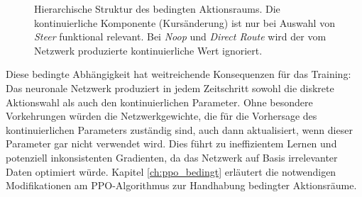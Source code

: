 \begin{figure}[htbp]
    \centering
    \caption[Hierarchische Struktur des bedingten Aktionsraums]{Hierarchische Struktur des bedingten Aktionsraums. Die kontinuierliche Komponente (Kursänderung) ist nur bei Auswahl von \textit{Steer} funktional relevant. Bei \textit{Noop} und \textit{Direct Route} wird der vom Netzwerk produzierte kontinuierliche Wert ignoriert.}
    \label{fig:action_tree}
\end{figure}

Diese bedingte Abhängigkeit hat weitreichende Konsequenzen für das Training: Das neuronale Netzwerk produziert in jedem Zeitschritt sowohl die diskrete Aktionswahl als auch den kontinuierlichen Parameter.
Ohne besondere Vorkehrungen würden die Netzwerkgewichte, die für die Vorhersage des kontinuierlichen Parameters zuständig sind, auch dann aktualisiert, wenn dieser Parameter gar nicht verwendet wird.
Dies führt zu ineffizientem Lernen und potenziell inkonsistenten Gradienten, da das Netzwerk auf Basis irrelevanter Daten optimiert würde.
Kapitel \ref{ch:ppo_bedingt} erläutert die notwendigen Modifikationen am \ac{PPO}\hyp{}Algorithmus zur Handhabung bedingter Aktionsräume.

